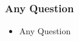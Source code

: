 \begin{frame}

\frametitle{Any Question}


\begin{itemize}
\item Any Question



\end{itemize}

\end{frame}